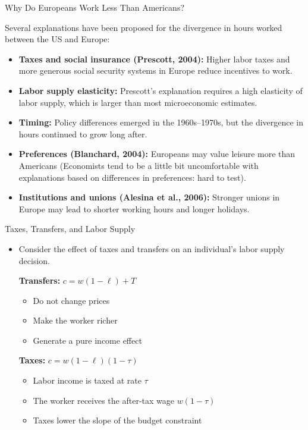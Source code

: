 \documentclass[10pt,aspectratio=169]{beamer}
\begin{document}
\begin{frame}{Why Do Europeans Work Less Than Americans?}

\small
Several explanations have been proposed for the divergence in hours worked between the US and Europe:

\bigskip

\begin{itemize}
    \item \textbf{Taxes and social insurance (Prescott, 2004):}  
    Higher labor taxes and more generous social security systems in Europe reduce incentives to work.

    \medskip
    \item \textbf{Labor supply elasticity:}  
    Prescott’s explanation requires a high elasticity of labor supply, which is larger than most microeconomic estimates.

    \medskip
    \item \textbf{Timing:}  
    Policy differences emerged in the 1960s–1970s, but the divergence in hours continued to grow long after.

    \medskip
    \item \textbf{Preferences (Blanchard, 2004):}  
    Europeans may value leisure more than Americans (Economists tend to be a little bit uncomfortable with explanations based on differences in
preferences: hard to test).

    \medskip
    \item \textbf{Institutions and unions (Alesina et al., 2006):}  
    Stronger unions in Europe may lead to shorter working hours and longer holidays.
\end{itemize}

\end{frame}

\begin{frame}{Taxes, Transfers, and Labor Supply}

\begin{itemize}


\item Consider the effect of taxes and transfers on an individual's labor supply decision.

\bigskip

\textbf{Transfers:} $c=w(1-\ell) + T$
\begin{itemize}
    \item Do not change prices
    \item Make the worker richer
    \item Generate a pure income effect
\end{itemize}
\bigskip


\textbf{Taxes:} $c=w(1-\ell) (1-\tau)$
\begin{itemize}
    \item Labor income is taxed at rate $\tau$
    \item The worker receives the after-tax wage $w(1-\tau)$
    \item Taxes lower the slope of the budget constraint
\end{itemize}


\end{itemize}
\end{frame}
\end{document}
